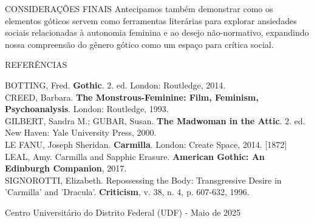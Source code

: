 \documentclass[final,a0paper,portrait]{beamer}
\begin{document}
\begin{frame}[t]
\begin{columns}[t]
\begin{column}{0.31\textwidth}
\begin{block}{\centering CONSIDERAÇÕES FINAIS}
\vspace{0.5cm}
Antecipamos também demonstrar como os elementos góticos servem como ferramentas literárias para explorar ansiedades sociais relacionadas à autonomia feminina e ao desejo não-normativo, expandindo nossa compreensão do gênero gótico como um espaço para crítica social.
\end{block}

\begin{block}{\centering REFERÊNCIAS}
\begin{flushleft}
\footnotesize
{}

BOTTING, Fred. \textbf{Gothic}. 2. ed. London: Routledge, 2014.\\

CREED, Barbara. \textbf{The Monstrous-Feminine: Film, Feminism, Psychoanalysis}. London: Routledge, 1993.\\

GILBERT, Sandra M.; GUBAR, Susan. \textbf{The Madwoman in the Attic}. 2. ed. New Haven: Yale University Press, 2000.\\

LE FANU, Joseph Sheridan. \textbf{Carmilla}. London: Create Space, 2014. [1872]\\

LEAL, Amy. Carmilla and Sapphic Erasure. \textbf{American Gothic: An Edinburgh Companion}, 2017.\\

SIGNOROTTI, Elizabeth. Repossessing the Body: Transgressive Desire in 'Carmilla' and 'Dracula'. \textbf{Criticism}, v. 38, n. 4, p. 607-632, 1996.
\end{flushleft}
\end{block}

\begin{center}
\vspace{0.5cm}
\textcolor{azultitulo}{\large Centro Universitário do Distrito Federal (UDF) - Maio de 2025}
\end{center}

\end{column}
\end{columns}
\end{frame}
\end{document}
